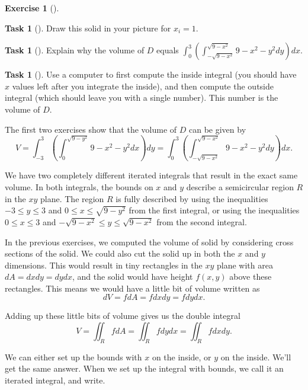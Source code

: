 \documentclass[10pt,]{book}
\theoremstyle{plain}
\theoremstyle{definition}
\theoremstyle{definition}
\theoremstyle{definition}
\theoremstyle{definition}
\newtheorem{exploration}[project]{Exercise}
\newtheorem{task}[project]{Task}
\theoremstyle{definition}
\numberwithin{equation}{section}
\newcommand{\ds}{\displaystyle}
\begin{document}
\begin{exploration}[]
\begin{task}[]\label{task-678}
Draw this solid in your picture for \(x_i = 1\).%
\end{task}
\begin{task}[]\label{task-679}
Explain why the volume of \(D\) equals \(\ds\int_{0}^{3} \left(\int_{-\sqrt{9-x^2}}^{\sqrt{9-x^2}}9-x^2-y^2 dy\right) dx\).%
\end{task}
\begin{task}[]\label{task-680}
Use a computer to first compute the inside integral (you should have \(x\) values left after you integrate the inside), and then compute the outside integral (which should leave you with a single number). This number is the volume of \(D\).%
\end{task}
\end{exploration}
The first two exercises show that the volume of \(D\) can be given by%
\begin{equation*}
V=\ds\int_{-3}^{3} \left(\int_0^{\sqrt{9-y^2}}9-x^2-y^2 dx\right) dy = \ds\int_{0}^{3} \left(\int_{-\sqrt{9-x^2}}^{\sqrt{9-x^2}}9-x^2-y^2 dy\right) dx.
\end{equation*}
%
\par
We have two completely different iterated integrals that result in the exact same volume. In both integrals, the bounds on \(x\) and \(y\) describe a semicircular region \(R\) in the \(xy\) plane. The region \(R\) is fully described by using the inequalities \(-3\leq y\leq 3\) and \(0\leq x\leq \sqrt{9-y^2}\) from the first integral, or using the inequalities \(0\leq x\leq 3\) and \(-\sqrt{9-x^2}\leq y\leq \sqrt{9-x^2}\) from the second integral.%
\par
In the previous exercises, we computed the volume of solid by considering cross sections of the solid. We could also cut the solid up in both the \(x\) and \(y\) dimensions. This would result in tiny rectangles in the \(xy\) plane with area \(dA=dxdy=dydx\), and the solid would have height \(f(x,y)\) above these rectangles. This means we would have a little bit of volume written as%
\begin{equation*}
dV=fdA=fdxdy=fdydx.
\end{equation*}
%
\par
Adding up these little bits of volume gives us the double integral%
\begin{equation*}
V = \iint_R fdA=\iint_R fdydx=\iint_R fdxdy.
\end{equation*}
%
\par
We can either set up the bounds with \(x\) on the inside, or \(y\) on the inside. We'll get the same answer. When we set up the integral with bounds, we call it an iterated integral, and write.%
\end{document}
